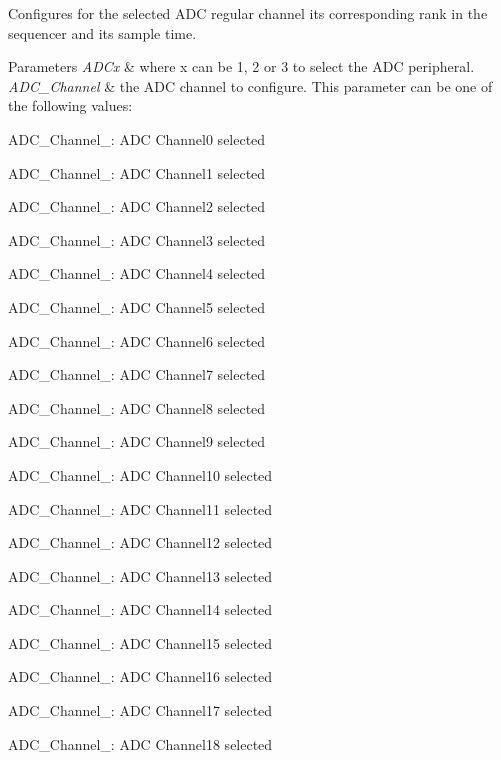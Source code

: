 Configures for the selected A\+DC regular channel its corresponding rank in the sequencer and its sample time. 


\begin{DoxyParams}{Parameters}
{\em A\+D\+Cx} & where x can be 1, 2 or 3 to select the A\+DC peripheral. \\
\hline
{\em A\+D\+C\+\_\+\+Channel} & the A\+DC channel to configure. This parameter can be one of the following values\+: \begin{DoxyItemize}
\item A\+D\+C\+\_\+\+Channel\+\_\+: A\+DC Channel0 selected \item A\+D\+C\+\_\+\+Channel\+\_\+: A\+DC Channel1 selected \item A\+D\+C\+\_\+\+Channel\+\_\+: A\+DC Channel2 selected \item A\+D\+C\+\_\+\+Channel\+\_\+: A\+DC Channel3 selected \item A\+D\+C\+\_\+\+Channel\+\_\+: A\+DC Channel4 selected \item A\+D\+C\+\_\+\+Channel\+\_\+: A\+DC Channel5 selected \item A\+D\+C\+\_\+\+Channel\+\_\+: A\+DC Channel6 selected \item A\+D\+C\+\_\+\+Channel\+\_\+: A\+DC Channel7 selected \item A\+D\+C\+\_\+\+Channel\+\_\+: A\+DC Channel8 selected \item A\+D\+C\+\_\+\+Channel\+\_\+: A\+DC Channel9 selected \item A\+D\+C\+\_\+\+Channel\+\_\+: A\+DC Channel10 selected \item A\+D\+C\+\_\+\+Channel\+\_\+: A\+DC Channel11 selected \item A\+D\+C\+\_\+\+Channel\+\_\+: A\+DC Channel12 selected \item A\+D\+C\+\_\+\+Channel\+\_\+: A\+DC Channel13 selected \item A\+D\+C\+\_\+\+Channel\+\_\+: A\+DC Channel14 selected \item A\+D\+C\+\_\+\+Channel\+\_\+: A\+DC Channel15 selected \item A\+D\+C\+\_\+\+Channel\+\_\+: A\+DC Channel16 selected \item A\+D\+C\+\_\+\+Channel\+\_\+: A\+DC Channel17 selected \item A\+D\+C\+\_\+\+Channel\+\_\+: A\+DC Channel18 selected \end{DoxyItemize}
\\

\end{DoxyParams}
